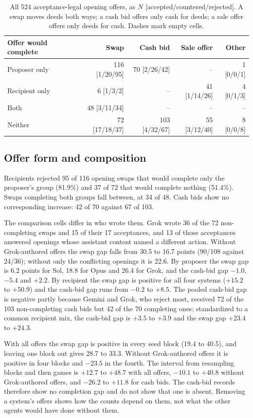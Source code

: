 \documentclass[11pt,letterpaper]{article}
\begin{document}
\begin{table}[t]\centering\small
\begin{tabular}{@{}lrrrr@{}}\toprule
Offer would complete & Swap & Cash bid & Sale offer & Other\\\midrule
Proposer only & 116 [1/20/95] & 70 [2/26/42] & -- & 1 [0/0/1]\\
Recipient only & 6 [1/3/2] & -- & 41 [1/14/26] & 4 [0/1/3]\\
Both & 48 [3/11/34] & -- & -- & --\\
Neither & 72 [17/18/37] & 103 [4/32/67] & 55 [3/12/40] & 8 [0/0/8]\\\bottomrule
\end{tabular}
\caption{All 524 acceptance-legal opening offers, as $N$ [accepted/countered/rejected]. A swap moves deeds both ways; a cash bid offers only cash for deeds; a sale offer offers only deeds for cash. Dashes mark empty cells.}
\label{tab:opening}\end{table}

\subsection{Offer form and composition}
Recipients rejected 95 of 116 opening swaps that would complete only the proposer's group (81.9\%) and 37 of 72 that would complete nothing (51.4\%). Swaps completing both groups fall between, at 34 of 48. Cash bids show no corresponding increase: 42 of 70 against 67 of 103.

The comparison cells differ in who wrote them. Grok wrote 36 of the 72 non-completing swaps and 15 of their 17 acceptances, and 13 of those acceptances answered openings whose assistant content named a different action. Without Grok-authored offers the swap gap falls from 30.5 to 16.7 points (90/108 against 24/36); without only the conflicting openings it is 22.6. By proposer the swap gap is 6.2 points for Sol, 18.8 for Opus and 26.4 for Grok, and the cash-bid gap $-1.0$, $-5.4$ and $+2.2$. By recipient the swap gap is positive for all four systems ($+15.2$ to $+50.9$) and the cash-bid gap runs from $-0.2$ to $+8.5$. The pooled cash-bid gap is negative partly because Gemini and Grok, who reject most, received 72 of the 103 non-completing cash bids but 42 of the 70 completing ones; standardized to a common recipient mix, the cash-bid gap is $+3.5$ to $+3.9$ and the swap gap $+23.4$ to $+24.3$.

With all offers the swap gap is positive in every seed block (19.4 to 40.5), and leaving one block out gives 28.7 to 33.3. Without Grok-authored offers it is positive in four blocks and $-23.5$ in the fourth. The interval from resampling blocks and then games is $+12.7$ to $+48.7$ with all offers, $-10.1$ to $+40.8$ without Grok-authored offers, and $-26.2$ to $+11.8$ for cash bids. The cash-bid records therefore show no completion gap and do not show that one is absent. Removing a system's offers shows how the counts depend on them, not what the other agents would have done without them.
\end{document}
